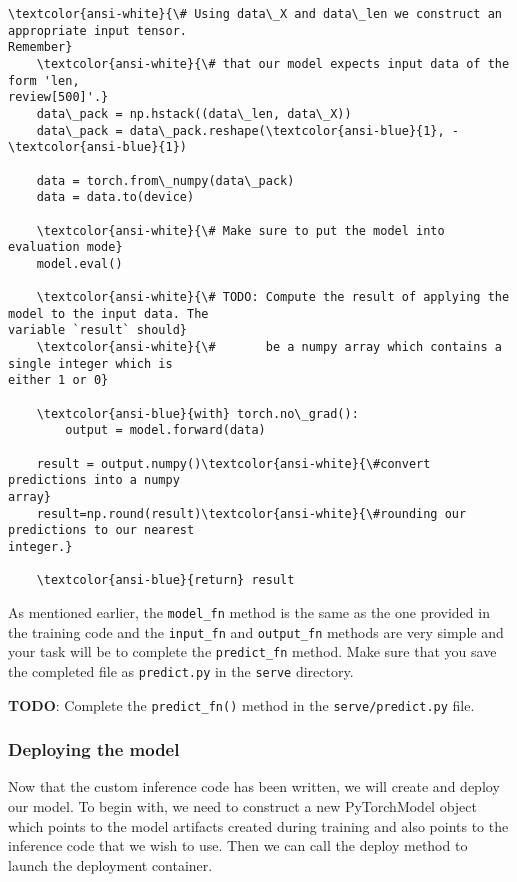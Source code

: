 \documentclass[11pt]{article}
\begin{document}
\begin{Verbatim}[commandchars=\\\{\}]
    \textcolor{ansi-white}{\# Using data\_X and data\_len we construct an appropriate input tensor.
Remember}
    \textcolor{ansi-white}{\# that our model expects input data of the form 'len,
review[500]'.}
    data\_pack = np.hstack((data\_len, data\_X))
    data\_pack = data\_pack.reshape(\textcolor{ansi-blue}{1}, -\textcolor{ansi-blue}{1})

    data = torch.from\_numpy(data\_pack)
    data = data.to(device)

    \textcolor{ansi-white}{\# Make sure to put the model into evaluation mode}
    model.eval()

    \textcolor{ansi-white}{\# TODO: Compute the result of applying the model to the input data. The
variable `result` should}
    \textcolor{ansi-white}{\#       be a numpy array which contains a single integer which is
either 1 or 0}

    \textcolor{ansi-blue}{with} torch.no\_grad():
        output = model.forward(data)

    result = output.numpy()\textcolor{ansi-white}{\#convert predictions into a numpy
array}
    result=np.round(result)\textcolor{ansi-white}{\#rounding our predictions to our nearest
integer.}

    \textcolor{ansi-blue}{return} result
    \end{Verbatim}

    As mentioned earlier, the \texttt{model\_fn} method is the same as the
one provided in the training code and the \texttt{input\_fn} and
\texttt{output\_fn} methods are very simple and your task will be to
complete the \texttt{predict\_fn} method. Make sure that you save the
completed file as \texttt{predict.py} in the \texttt{serve} directory.

\textbf{TODO}: Complete the \texttt{predict\_fn()} method in the
\texttt{serve/predict.py} file.

    \hypertarget{deploying-the-model}{%
\subsubsection{Deploying the model}\label{deploying-the-model}}

Now that the custom inference code has been written, we will create and
deploy our model. To begin with, we need to construct a new PyTorchModel
object which points to the model artifacts created during training and
also points to the inference code that we wish to use. Then we can call
the deploy method to launch the deployment container.
\end{document}
